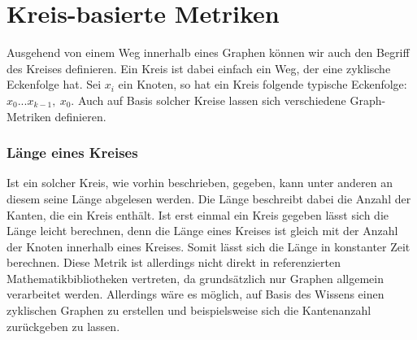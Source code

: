 \documentclass[a4paper,12pt,ngerman,chapterprefix=false,listof=totoc,bibliography=totoc]{scrreprt}
\begin{document}
\section{Kreis-basierte Metriken}
{
Ausgehend von einem Weg innerhalb eines Graphen können wir auch den Begriff des Kreises definieren. Ein Kreis ist dabei einfach ein Weg, der eine zyklische Eckenfolge hat. Sei \(x_i\) ein Knoten, so hat ein Kreis folgende typische Eckenfolge: \(x_0...x_{k-1},\ x_0\). \cite{diestel_graphentheorie_2000} Auch auf Basis solcher Kreise lassen sich verschiedene Graph-Metriken definieren.
}
\subsubsection*{Länge eines Kreises}
{
Ist ein solcher Kreis, wie vorhin beschrieben, gegeben, kann unter anderen an diesem seine Länge abgelesen werden. Die Länge beschreibt dabei die Anzahl der Kanten, die ein Kreis enthält. Ist erst einmal ein Kreis gegeben lässt sich die Länge leicht berechnen, denn die Länge eines Kreises ist gleich mit der Anzahl der Knoten innerhalb eines Kreises. Somit lässt sich die Länge in konstanter Zeit berechnen. \cite{diestel_graphentheorie_2000} Diese Metrik ist allerdings nicht direkt in referenzierten Mathematikbibliotheken vertreten, da grundsätzlich nur Graphen allgemein verarbeitet werden. Allerdings wäre es möglich, auf Basis des Wissens einen zyklischen Graphen zu erstellen und beispielsweise sich die Kantenanzahl zurückgeben zu lassen.
}
\end{document}
